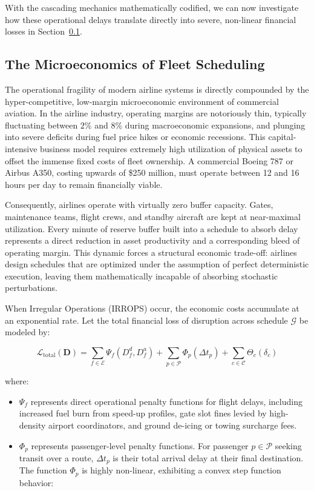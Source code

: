 \documentclass[11pt,a4paper]{book}
\begin{document}
With the cascading mechanics mathematically codified, we can now investigate how these operational delays translate directly into severe, non-linear financial losses in Section~\ref{sec:microeconomics}.

\subsection{The Microeconomics of Fleet Scheduling}\label{sec:microeconomics}

The operational fragility of modern airline systems is directly compounded by the hyper-competitive, low-margin microeconomic environment of commercial aviation. In the airline industry, operating margins are notoriously thin, typically fluctuating between $2\%$ and $8\%$ during macroeconomic expansions, and plunging into severe deficits during fuel price hikes or economic recessions. This capital-intensive business model requires extremely high utilization of physical assets to offset the immense fixed costs of fleet ownership. A commercial Boeing 787 or Airbus A350, costing upwards of \$250 million, must operate between 12 and 16 hours per day to remain financially viable.

Consequently, airlines operate with virtually zero buffer capacity. Gates, maintenance teams, flight crews, and standby aircraft are kept at near-maximal utilization. Every minute of reserve buffer built into a schedule to absorb delay represents a direct reduction in asset productivity and a corresponding bleed of operating margin. This dynamic forces a structural economic trade-off: airlines design schedules that are optimized under the assumption of perfect deterministic execution, leaving them mathematically incapable of absorbing stochastic perturbations.

When Irregular Operations (IRROPS) occur, the economic costs accumulate at an exponential rate. Let the total financial loss of disruption across schedule $\mathcal{G}$ be modeled by:

\begin{equation}
\label{eq:total_loss}
\mathcal{L}_{\text{total}}\left(\mathbf{D}\right) = \sum_{f \in \mathcal{E}} \Psi_f\left(D_f^d, D_f^a\right) + \sum_{p \in \mathcal{P}} \Phi_p\left(\Delta t_p\right) + \sum_{c \in \mathcal{C}} \Theta_c\left(\delta_c\right)
\end{equation}

where:
\begin{itemize}
    \item $\Psi_f$ represents direct operational penalty functions for flight delays, including increased fuel burn from speed-up profiles, gate slot fines levied by high-density airport coordinators, and ground de-icing or towing surcharge fees.
    \item $\Phi_p$ represents passenger-level penalty functions. For passenger $p \in \mathcal{P}$ seeking transit over a route, $\Delta t_p$ is their total arrival delay at their final destination. The function $\Phi_p$ is highly non-linear, exhibiting a convex step function behavior:
\end{itemize}
\end{document}
